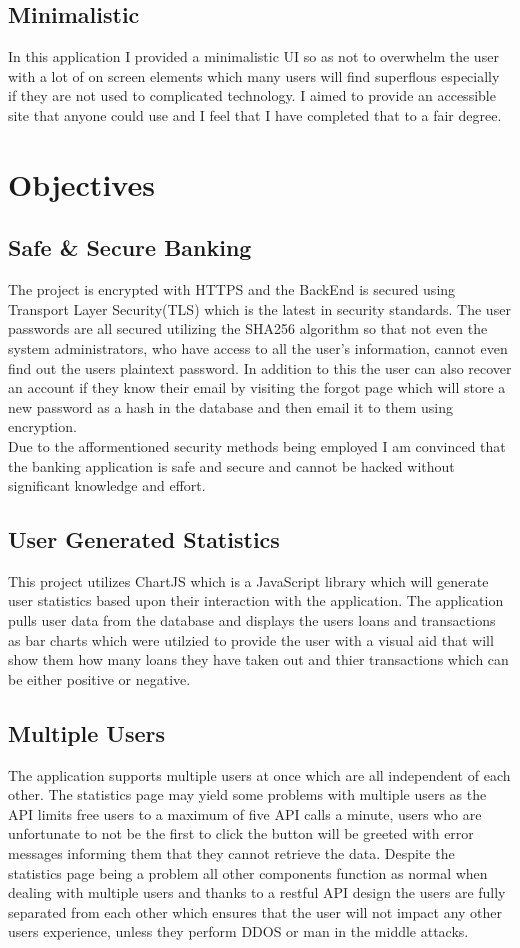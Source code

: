 \subsection{Minimalistic}
In this application I provided a minimalistic UI so as not to overwhelm the user
with a lot of on screen elements which many users will find superflous especially
if they are not used to complicated technology.  I aimed to provide an accessible
site that anyone could use and I feel that I have completed that to a fair degree.
\section{Objectives}
\subsection{Safe \& Secure Banking}
The project is encrypted with HTTPS and the BackEnd is secured using Transport
Layer Security(TLS) which is the latest in security standards.  The user passwords
are all secured utilizing the SHA256 algorithm so that not even the system administrators,
who have access to all the user's information, cannot even find out the users plaintext
password.  In addition to this the user can also recover an account if they know their email
by visiting the forgot page which will store a new password as a hash in the database and
then email it to them using encryption.
\\
Due to the afformentioned security methods being employed I am convinced that the
banking application is safe and secure and cannot be hacked without significant knowledge
and effort.
\subsection{User Generated Statistics}
This project utilizes ChartJS which is a JavaScript library which will generate
user statistics based upon their interaction with the application.  The application
pulls user data from the database and displays the users loans and transactions as
bar charts which were utilzied to provide the user with a visual aid that will show
them how many loans they have taken out and thier transactions which can be either
positive or negative.
\subsection{Multiple Users}
The application supports multiple users at once which are all independent of each
other.  The statistics page may yield some problems with multiple users as the
API limits free users to a maximum of five API calls a minute, users who are unfortunate
to not be the first to click the button will be greeted with error messages informing them
that they cannot retrieve the data.  Despite the statistics page being a problem all other
components function as normal when dealing with multiple users and thanks to a restful API
design the users are fully separated from each other which ensures that the user will not
impact any other users experience, unless they perform DDOS or man in the middle attacks.
